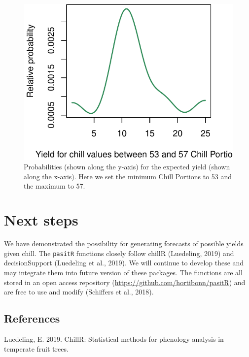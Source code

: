 \documentclass[]{article}
\begin{document}
\begin{figure}
\centering
\includegraphics{Full_SHE_Chill_Yield_Model_files/figure-latex/chillkernelslicerange-1.pdf}
\caption{\label{fig:chillkernelslicerange}Probabilities (shown along the
y-axis) for the expected yield (shown along the x-axis). Here we set the
minimum Chill Portions to 53 and the maximum to 57.}
\end{figure}

\hypertarget{next-steps}{%
\section{Next steps}\label{next-steps}}

We have demonstrated the possibility for generating forecasts of
possible yields given chill. The \texttt{pasitR} functions closely
follow chillR (Luedeling, 2019) and decisionSupport (Luedeling et al.,
2019). We will continue to develop these and may integrate them into
future version of these packages. The functions are all stored in an
open access repository (\url{https://github.com/hortibonn/pasitR}) and
are free to use and modify (Schiffers et al., 2018).

\hypertarget{references}{%
\subsection*{References}\label{references}}

\hypertarget{refs}{}
\leavevmode\hypertarget{ref-R-chillR}{}%
Luedeling, E. 2019. ChillR: Statistical methods for phenology analysis
in temperate fruit trees.
\end{document}

